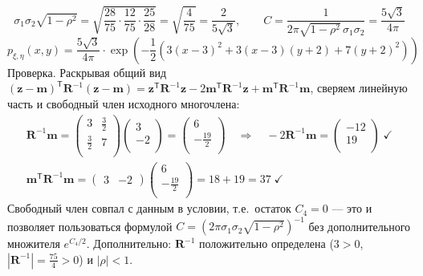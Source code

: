 \documentclass[12pt]{spbstu-task}
\begin{document}
\begin{displaymath}
  \sigma_1\sigma_2\sqrt{1 - \rho^2} = \sqrt{\frac{28}{75}\cdot\frac{12}{75}\cdot\frac{25}{28}} = \sqrt{\frac{4}{75}} = \frac{2}{5\sqrt{3}},
  \qquad
  C = \frac{1}{2\pi\sqrt{1 - \rho^2}\,\sigma_1\sigma_2} = \frac{5\sqrt{3}}{4\pi}
\end{displaymath}
\begin{displaymath}
  p_{\xi,\eta}(x,y) = \frac{5\sqrt{3}}{4\pi}\cdot\exp\left(-\frac{1}{2}\left(3(x - 3)^2 + 3(x - 3)(y + 2) + 7(y + 2)^2\right)\right)
\end{displaymath}
Проверка. Раскрывая общий вид
\(\left(\mathbf{z} - \mathbf{m}\right)^\mathsf{T}\mathbf{R}^{-1}\left(\mathbf{z} - \mathbf{m}\right)
= \mathbf{z}^\mathsf{T}\mathbf{R}^{-1}\mathbf{z} - 2\mathbf{m}^\mathsf{T}\mathbf{R}^{-1}\mathbf{z} + \mathbf{m}^\mathsf{T}\mathbf{R}^{-1}\mathbf{m}\),
сверяем линейную часть и свободный член исходного многочлена:
\begin{gather*}
  \mathbf{R}^{-1}\mathbf{m} = \begin{pmatrix}
    3 & \frac{3}{2} \\
    \frac{3}{2} & 7 \\
  \end{pmatrix}\begin{pmatrix}
    3 \\ -2 \\
  \end{pmatrix} = \begin{pmatrix}
    6 \\ -\frac{19}{2} \\
  \end{pmatrix}
  \quad\Rightarrow\quad
  -2\mathbf{R}^{-1}\mathbf{m} = \begin{pmatrix}
    -12 \\ 19 \\
  \end{pmatrix}\;\checkmark \\
  \mathbf{m}^\mathsf{T}\mathbf{R}^{-1}\mathbf{m} = \begin{pmatrix}3 & -2\end{pmatrix}\begin{pmatrix}
    6 \\ -\frac{19}{2} \\
  \end{pmatrix} = 18 + 19 = 37\;\checkmark
\end{gather*}
Свободный член совпал с данным в условии, т.е.\ остаток \(C_4 = 0\) --- это и
позволяет пользоваться формулой \(C = \left(2\pi\sigma_1\sigma_2\sqrt{1 - \rho^2}\right)^{-1}\)
без дополнительного множителя \(e^{C_4/2}\). Дополнительно:
\(\mathbf{R}^{-1}\) положительно определена (\(3 > 0\), \(\left|\mathbf{R}^{-1}\right| = \frac{75}{4} > 0\)) и \(|\rho| < 1\).
\end{document}
